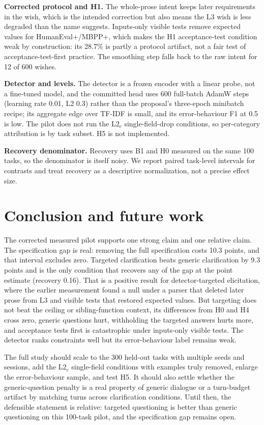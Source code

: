 \documentclass{article}
\begin{document}
\textbf{Corrected protocol and H1.} The whole-prose intent keeps later requirements in the
wish, which is the intended correction but also means the L3 wish is less degraded than the
name suggests. Inputs-only visible tests remove expected values for HumanEval+/MBPP+, which
makes the H1 acceptance-test condition weak by construction: its 28.7\% is partly a protocol
artifact, not a fair test of acceptance-test-first practice. The smoothing step falls back to
the raw intent for 12 of 600 wishes.

\textbf{Detector and levels.} The detector is a frozen encoder with a linear probe, not a
fine-tuned model, and the committed head uses 600 full-batch AdamW steps (learning rate 0.01,
L2 0.3) rather than the proposal's three-epoch minibatch recipe; its aggregate edge over TF-IDF
is small, and its error-behaviour F1 at 0.5 is low. The pilot does not run the L2$_c$
single-field-drop conditions, so per-category attribution is by task subset. H5 is not
implemented.

\textbf{Recovery denominator.} Recovery uses B1 and H0 measured on the same 100 tasks, so the
denominator is itself noisy. We report paired task-level intervals for contrasts and treat
recovery as a descriptive normalization, not a precise effect size.

\section{Conclusion and future work}

The corrected measured pilot supports one strong claim and one relative claim. The
specification gap is real: removing the full specification costs 10.3 points, and that
interval excludes zero. Targeted clarification beats generic clarification by 9.3 points and
is the only condition that recovers any of the gap at the point estimate (recovery 0.16). That
is a positive result for detector-targeted elicitation, where the earlier measurement found a
null under a parser that deleted later prose from L3 and visible tests that restored expected
values. But targeting does not beat the ceiling or sibling-function
context, its differences from H0 and H4 cross zero, generic questions hurt, withholding the
targeted answers hurts more, and acceptance tests first is catastrophic under inputs-only
visible tests. The detector ranks constraints well but its error-behaviour label remains
weak.

The full study should scale to the 300 held-out tasks with multiple seeds and sessions, add
the L2$_c$ single-field conditions with examples truly removed, enlarge the error-behaviour
sample, and test H5. It should also settle whether the generic-question penalty is a real
property of generic dialogue or a turn-budget artifact by matching turns across clarification
conditions. Until then, the defensible statement is relative: targeted questioning is better
than generic questioning on this 100-task pilot, and the specification gap remains open.
\end{document}

